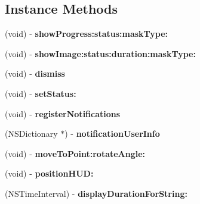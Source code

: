 \subsection*{Instance Methods}
\begin{DoxyCompactItemize}
\item 
\mbox{\label{category_s_v_progress_h_u_d_07_08_a6d19acc301484997c21b253543154260}} 
(void) -\/ {\bfseries show\+Progress\+:status\+:mask\+Type\+:}
\item 
\mbox{\label{category_s_v_progress_h_u_d_07_08_a2e90e53d24bccebb365907042dc00df0}} 
(void) -\/ {\bfseries show\+Image\+:status\+:duration\+:mask\+Type\+:}
\item 
\mbox{\label{category_s_v_progress_h_u_d_07_08_aa14c45cf4b8852b71ae0d59ec4566ae1}} 
(void) -\/ {\bfseries dismiss}
\item 
\mbox{\label{category_s_v_progress_h_u_d_07_08_a50a7cc8081cf7b9dd357ef899fa5fda6}} 
(void) -\/ {\bfseries set\+Status\+:}
\item 
\mbox{\label{category_s_v_progress_h_u_d_07_08_a6195848845c300fd98d8fa54084e1004}} 
(void) -\/ {\bfseries register\+Notifications}
\item 
\mbox{\label{category_s_v_progress_h_u_d_07_08_a91900ba9b9fbc17b4c600ee5c82ae635}} 
(N\+S\+Dictionary $\ast$) -\/ {\bfseries notification\+User\+Info}
\item 
\mbox{\label{category_s_v_progress_h_u_d_07_08_a63587cc57f7350dc8098203546b43455}} 
(void) -\/ {\bfseries move\+To\+Point\+:rotate\+Angle\+:}
\item 
\mbox{\label{category_s_v_progress_h_u_d_07_08_a9179b61ba7effd5e8d5fd1b4e94e5b1e}} 
(void) -\/ {\bfseries position\+H\+U\+D\+:}
\item 
\mbox{\label{category_s_v_progress_h_u_d_07_08_a71cc4da54c6787bbdf5414fc12d4c30b}} 
(N\+S\+Time\+Interval) -\/ {\bfseries display\+Duration\+For\+String\+:}
\end{DoxyCompactItemize}
